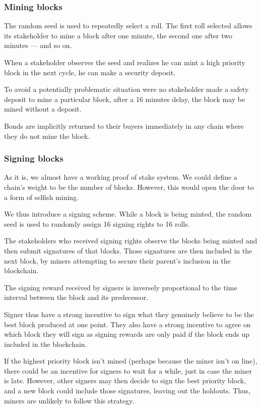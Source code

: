 \documentclass[letterpaper]{article}
\begin{document}
\subsubsection{Mining blocks}
The random seed is used to repeatedly select a roll. The first roll selected
allows its stakeholder to mine a block after one minute, the second one after
two minutes --- and so on. 

When a stakeholder observes the seed and realizes he can mint a high priority
block in the next cycle, he can make a security deposit.

To avoid a potentially problematic situation were no stakeholder made a 
safety deposit to mine a particular block, after a 16 minutes delay, the
block may be mined without a deposit.

Bonds are implicitly returned to their buyers immediately in any chain
where they do not mine the block.

\subsubsection{Signing blocks}
As it is, we almost have a working proof of stake system.
We could define a chain's weight to be the number of blocks.
However, this would open the door to a form of selfish mining.

We thus introduce a signing scheme. While a block is being minted, the random
seed is used to randomly assign 16 signing rights to 16 rolls. 

The stakeholders who received signing rights observe the blocks being minted and
then submit signatures of that blocks. Those signatures are then included in
the next block, by miners attempting to secure their parent's inclusion in the
blockchain.

The signing reward received by signers is inversely proportional to the time
interval between the block and its predecessor.

Signer thus have a strong incentive to sign what they genuinely believe to be
the best block produced at one point. They also have a strong incentive to agree
on which block they will sign as signing rewards are only paid if the block ends
up included in the blockchain.

If the highest priority block isn't mined (perhaps because the miner isn't
on line), there could be an incentive for signers to wait for a while, just
in case the miner is late. However, other signers may then decide to sign the
best priority block, and a new block could include those signatures, leaving out
the holdouts. Thus, miners are unlikely to follow this strategy.
\end{document}
